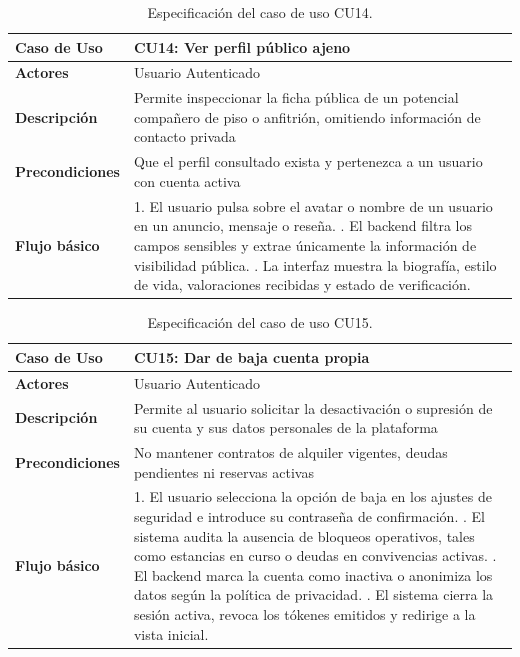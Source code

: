 \begin{table}[H]
\centering
\begin{tabular}{|p{3.1cm}|p{10.9cm}|}
\hline
\textbf{Caso de Uso} & \textbf{CU14: Ver perfil público ajeno} \\ \hline
\textbf{Actores} & Usuario Autenticado \\ \hline
\textbf{Descripción} & Permite inspeccionar la ficha pública de un potencial compañero de piso o anfitrión, omitiendo información de contacto privada \\ \hline
\textbf{Precondiciones} & Que el perfil consultado exista y pertenezca a un usuario con cuenta activa \\ \hline
\textbf{Flujo básico} & 
1. El usuario pulsa sobre el avatar o nombre de un usuario en un anuncio, mensaje o reseña. \newline
2. El backend filtra los campos sensibles y extrae únicamente la información de visibilidad pública. \newline
3. La interfaz muestra la biografía, estilo de vida, valoraciones recibidas y estado de verificación. \\ \hline
\end{tabular}
\caption{Especificación del caso de uso CU14.}
\label{tab:cu14}
\end{table}

\begin{table}[H]
\centering
\begin{tabular}{|p{3.1cm}|p{10.9cm}|}
\hline
\textbf{Caso de Uso} & \textbf{CU15: Dar de baja cuenta propia} \\ \hline
\textbf{Actores} & Usuario Autenticado \\ \hline
\textbf{Descripción} & Permite al usuario solicitar la desactivación o supresión de su cuenta y sus datos personales de la plataforma \\ \hline
\textbf{Precondiciones} & No mantener contratos de alquiler vigentes, deudas pendientes ni reservas activas \\ \hline
\textbf{Flujo básico} & 
1. El usuario selecciona la opción de baja en los ajustes de seguridad e introduce su contraseña de confirmación. \newline
2. El sistema audita la ausencia de bloqueos operativos, tales como estancias en curso o deudas en convivencias activas. \newline
3. El backend marca la cuenta como inactiva o anonimiza los datos según la política de privacidad. \newline
4. El sistema cierra la sesión activa, revoca los tókenes emitidos y redirige a la vista inicial. \\ \hline
\end{tabular}
\caption{Especificación del caso de uso CU15.}
\label{tab:cu15}
\end{table}